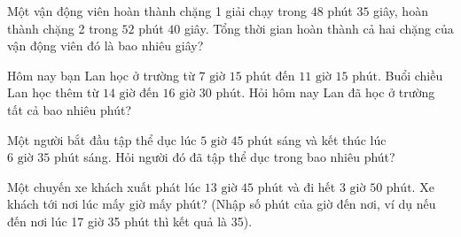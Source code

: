\begin{ex} %
Một vận động viên hoàn thành chặng 1 giải chạy trong $48$ phút $35$ giây, hoàn thành chặng 2 trong $52$ phút $40$ giây. Tổng thời gian hoàn thành cả hai chặng của vận động viên đó là bao nhiêu giây?
\end{ex}

\begin{ex} %
Hôm nay bạn Lan học ở trường từ $7\text{ giờ } 15\text{ phút}$ đến $11\text{ giờ } 15\text{ phút}$. Buổi chiều Lan học thêm từ $14\text{ giờ}$ đến $16\text{ giờ } 30\text{ phút}$. Hỏi hôm nay Lan đã học ở trường tất cả bao nhiêu phút?
\end{ex}

\begin{ex} %
Một người bắt đầu tập thể dục lúc $5\text{ giờ } 45\text{ phút}$ sáng và kết thúc lúc $6\text{ giờ } 35\text{ phút}$ sáng. Hỏi người đó đã tập thể dục trong bao nhiêu phút?
\end{ex}

\begin{ex} %
Một chuyến xe khách xuất phát lúc $13\text{ giờ } 45\text{ phút}$ và đi hết $3\text{ giờ } 50\text{ phút}$. Xe khách tới nơi lúc mấy giờ mấy phút? (Nhập số phút của giờ đến nơi, ví dụ nếu đến nơi lúc 17 giờ 35 phút thì kết quả là 35).
\end{ex}
